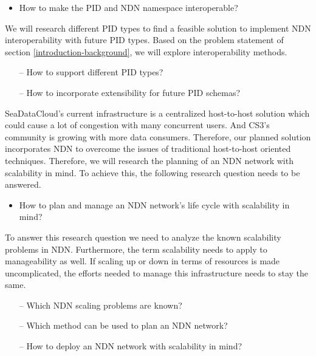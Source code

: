 \begin{itemize}
	\item How to make the PID and NDN namespace interoperable?
\end{itemize}

We will research different PID types to find a feasible solution to implement NDN interoperability with future PID types. Based on the problem statement of section \ref{introduction-background}, 
we will explore interoperability methods.


\begin{itemize}
    \item[--] How to support different PID types?
    \item[--] How to incorporate extensibility for future PID schemas?
\end{itemize}


SeaDataCloud's current infrastructure is a centralized host-to-host solution which could cause a lot of congestion with many concurrent users. And CS3's community is growing with more data consumers. Therefore, our planned solution incorporates NDN to overcome the issues of traditional host-to-host oriented techniques. Therefore, we will research the planning of an NDN network with scalability in mind. To achieve this, the following research question needs to be answered.   
\begin{itemize}
    \item How to plan and manage an NDN network's life cycle with scalability in mind?
\end{itemize}

To answer this research question we need to analyze the known scalability problems in NDN. Furthermore, the term scalability needs to apply to manageability as well. If scaling up or down in terms of resources is made uncomplicated, the efforts needed to manage this infrastructure needs to stay the same.
\begin{itemize}
    \item[--] Which NDN scaling problems are known?
    \item[--] Which method can be used to plan an NDN network?
    \item[--] How to deploy an NDN network with scalability in mind?
\end{itemize}

